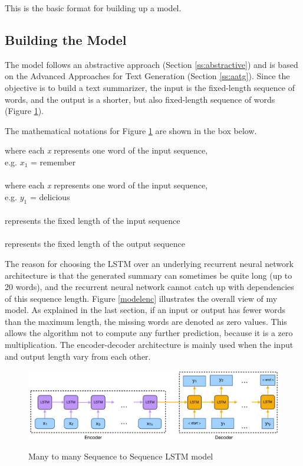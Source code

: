 This is the basic format for building up a model.

\subsection{Building the Model}\label{ss:build}

The model follows an abstractive approach (Section \ref{ss:abstractive}) and is based on the Advanced Approaches for Text Generation (Section \ref{ss:aatg}). Since the objective is to build a text summarizer, the input is the fixed-length sequence of words, and the output is a shorter, but also fixed-length sequence of words (Figure \ref{build_model}).

The mathematical notations for Figure \ref{build_model} are shown in the box below.

\begin{tcolorbox}
	\boldmath{\([x_{1}, x_{2}, x_{3}, ..., {x_{Tx}]}\)} where each \textit{x} represents one word of the input sequence, \\ e.g. \(x_{1}\) = remember \\ \\
	\boldmath{\([y_{1}, y_{2}, x_{3}, ..., {y_{Ty}]}\)} where each \textit{x} represents one word of the input sequence, \\ e.g. \(y_{1}\) = delicious \\ \\
	 represents the fixed length of the input sequence \\ \\
	 represents the fixed length of the output sequence
\end{tcolorbox}

The reason for choosing the LSTM over an underlying recurrent neural network architecture is that the generated summary can sometimes be quite long (up to 20 words), and the recurrent neural network cannot catch up with dependencies of this sequence length. Figure \ref{modelenc} illustrates the overall view of my model. 
As explained in the last section, if an input or output has fewer words than the maximum length, the missing words are denoted as zero values. This allows the algorithm not to compute any further prediction, because it is a zero multiplication. The encoder-decoder architecture is mainly used when the input and output length vary from each other. 

\begin{figure}
	\begin{center}
		\includegraphics[width=6in]{photos/build-1}\\
		\caption{Many to many Sequence to Sequence LSTM model}\label{build_model}
	\end{center}
\end{figure}

